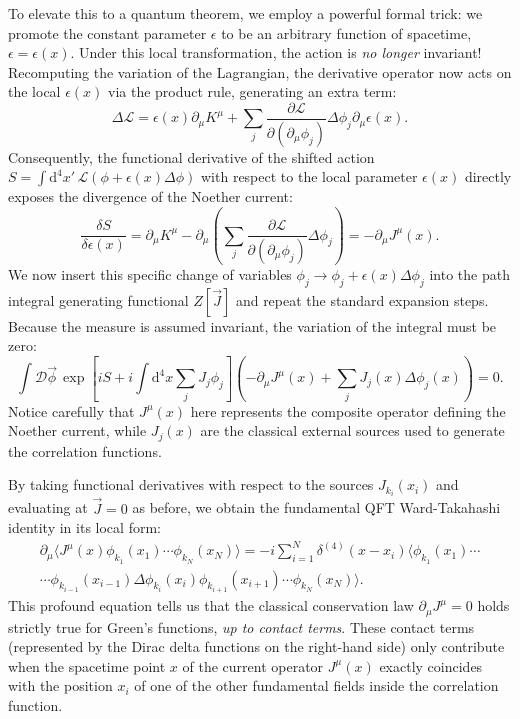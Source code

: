 To elevate this to a quantum theorem, we employ a powerful formal trick: we promote the constant parameter $\epsilon$ to be an arbitrary function of spacetime, $\epsilon = \epsilon(x)$. Under this local transformation, the action is \textit{no longer} invariant! Recomputing the variation of the Lagrangian, the derivative operator now acts on the local $\epsilon(x)$ via the product rule, generating an extra term:
\[
    \Delta\mathcal{L} = \epsilon(x) \partial_\mu K^\mu + \sum_j \frac{\partial \mathcal{L}}{\partial (\partial_\mu \phi_j)} \Delta\phi_j \partial_\mu \epsilon(x).
\]
Consequently, the functional derivative of the shifted action $S = \int \mathrm{d}^4x' \, \mathcal{L}(\phi + \epsilon(x)\Delta\phi)$ with respect to the local parameter $\epsilon(x)$ directly exposes the divergence of the Noether current:
\[
    \frac{\delta S}{\delta \epsilon(x)} = \partial_\mu K^\mu - \partial_\mu \left( \sum_j \frac{\partial \mathcal{L}}{\partial (\partial_\mu \phi_j)} \Delta\phi_j \right) = - \partial_\mu J^\mu(x).
\]
We now insert this specific change of variables $\phi_j \to \phi_j + \epsilon(x)\Delta\phi_j$ into the path integral generating functional $Z[\vec{J}]$ and repeat the standard expansion steps. Because the measure is assumed invariant, the variation of the integral must be zero:
\[
    \int \mathcal{D}\vec{\phi} \, \exp\left[ iS + i \int \mathrm{d}^4x \sum_j J_j \phi_j \right] \left( - \partial_\mu J^\mu(x) + \sum_j J_j(x) \Delta\phi_j(x) \right) = 0.
\]
Notice carefully that $J^\mu(x)$ here represents the composite operator defining the Noether current, while $J_j(x)$ are the classical external sources used to generate the correlation functions.

By taking functional derivatives with respect to the sources $J_{k_i}(x_i)$ and evaluating at $\vec{J}=0$ as before, we obtain the fundamental QFT Ward-Takahashi identity in its local form:
\[
    \begin{aligned}
        \partial_\mu \langle J^\mu(x) \phi_{k_1}(x_1) \cdots \phi_{k_N}(x_N) \rangle = -i \sum_{i=1}^N \delta^{(4)}(x - x_i) \langle \phi_{k_1}(x_1) \cdots \\
        \cdots \phi_{k_{i-1}}(x_{i-1}) \Delta\phi_{k_i}(x_i) \phi_{k_{i+1}}(x_{i+1}) \cdots \phi_{k_N}(x_N) \rangle.
    \end{aligned}
\]
This profound equation tells us that the classical conservation law $\partial_\mu J^\mu = 0$ holds strictly true for Green's functions, \textit{up to contact terms}. These contact terms (represented by the Dirac delta functions on the right-hand side) only contribute when the spacetime point $x$ of the current operator $J^\mu(x)$ exactly coincides with the position $x_i$ of one of the other fundamental fields inside the correlation function.

